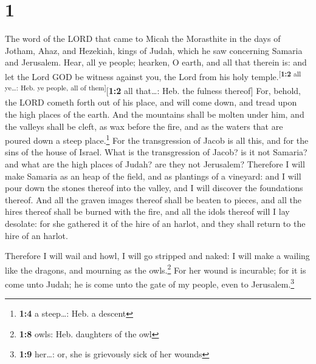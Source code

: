 \hypertarget{section}{%
\section{1}\label{section}}

 The word of the LORD that came to Micah the Morasthite in
the days of Jotham, Ahaz, and Hezekiah, kings of Judah, which he saw
concerning Samaria and Jerusalem.  Hear, all ye people;
hearken, O earth, and all that therein is: and let the Lord GOD be
witness against you, the Lord from his holy
temple.\textsuperscript{{[}\textbf{1:2} all ye\ldots: Heb. ye people,
all of them{]}}{[}\textbf{1:2} all that\ldots: Heb. the fulness
thereof{]}  For, behold, the LORD cometh forth out of his
place, and will come down, and tread upon the high places of the earth.
 And the mountains shall be molten under him, and the
valleys shall be cleft, as wax before the fire, and as the waters that
are poured down a steep place.\footnote{\textbf{1:4} a steep\ldots: Heb.
  a descent}  For the transgression of Jacob is all this,
and for the sins of the house of Israel. What is the transgression of
Jacob? is it not Samaria? and what are the high places of Judah? are
they not Jerusalem?  Therefore I will make Samaria as an
heap of the field, and as plantings of a vineyard: and I will pour down
the stones thereof into the valley, and I will discover the foundations
thereof.  And all the graven images thereof shall be
beaten to pieces, and all the hires thereof shall be burned with the
fire, and all the idols thereof will I lay desolate: for she gathered it
of the hire of an harlot, and they shall return to the hire of an
harlot.

 Therefore I will wail and howl, I will go stripped and
naked: I will make a wailing like the dragons, and mourning as the
owls.\footnote{\textbf{1:8} owls: Heb. daughters of the owl}
 For her wound is incurable; for it is come unto Judah; he
is come unto the gate of my people, even to Jerusalem.\footnote{\textbf{1:9}
  her\ldots: or, she is grievously sick of her wounds}

